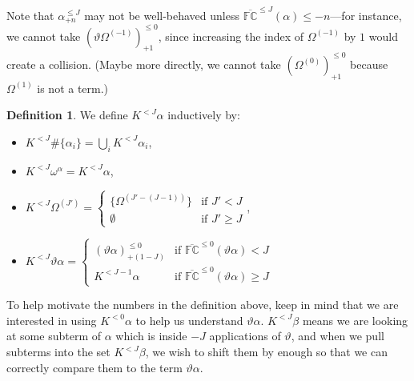 \documentclass[11pt]{amsart}
\theoremstyle{definition}
\newtheorem{definition}[theorem]{Definition}
\begin{document}
Note that $\alpha^{\leq J}_{+n}$ may not be well-behaved unless $\overline{\mathbb{FC}}^{\leq J}(\alpha)\leq -n$---for instance, we cannot take $(\vartheta\Omega^{(-1)})^{\leq 0}_{+1}$, since increasing the index of $\Omega^{(-1)}$ by $1$ would create a collision. (Maybe more directly, we cannot take $(\Omega^{(0)})^{\leq 0}_{+1}$ because $\Omega^{(1)}$ is not a term.)

\begin{definition}
  We define $K^{< J}\alpha$ inductively by:
  \begin{itemize}
  \item $K^{< J}\#\{\alpha_i\}=\bigcup_i K^{< J}\alpha_i$,
  \item $K^{< J}\omega^\alpha=K^{< J}\alpha$,
  \item $K^{< J}\Omega^{(J')}=\left\{\begin{array}{ll}
                                          \{\Omega^{(J'-(J-1))}\}&\text{if }J'< J\\
                                          \emptyset&\text{if }J'\geq J
                                        \end{array}\right.$,
  \item $K^{< J}\vartheta\alpha=\left\{\begin{array}{ll}
                                            (\vartheta\alpha)^{\leq 0}_{+(1-J)}&\text{if }\overline{\mathbb{FC}}^{\leq 0}(\vartheta\alpha)<J\\
                                            K^{< J-1}\alpha&\text{if }\overline{\mathbb{FC}}^{\leq 0}(\vartheta\alpha)\geq J
                                          \end{array}\right.$
  \end{itemize}
\end{definition}
To help motivate the numbers in the definition above, keep in mind that we are interested in using $K^{<0}\alpha$ to help us understand $\vartheta\alpha$. $K^{<J}\beta$ means we are looking at some subterm of $\alpha$ which is inside $-J$ applications of $\vartheta$, and when we pull subterms into the set $K^{<J}\beta$, we wish to shift them by enough so that we can correctly compare them to the term $\vartheta\alpha$.
\end{document}
